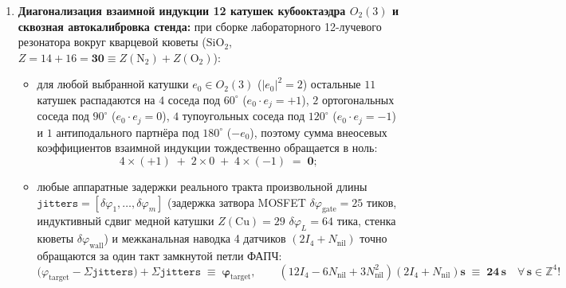 \begin{enumerate}[label=\textbf{\arabic*.},leftmargin=*]
\begin{itemize}[noitemsep]
  \item \emph{Слой~4 (Базовый переход IBC-$\mathrm{Si}$ с тыльными контактами):} принимает триплетную пару при шаге переноса $\Delta\varphi_{\mathrm{seam}} = 21 < 41$ по первому закону Ньютона в зазоре зацепления с \textbf{нулевым рождением тепловых фононов ($\hat{n}_E(21) = 0$)}!
  \end{itemize}
\item \textbf{Диагонализация взаимной индукции 12 катушек кубооктаэдра $O_2(3)$ и сквозная автокалибровка стенда:}
  при сборке лабораторного 12-лучевого резонатора вокруг кварцевой кюветы ($\mathrm{SiO_2}$, $Z = 14 + 16 = \mathbf{30} \equiv Z(\mathrm{N_2}) + Z(\mathrm{O_2})$):
  \begin{itemize}[noitemsep]
  \item для любой выбранной катушки $e_0\in O_2(3)$ ($|e_0|^2 = 2$) остальные $11$ катушек распадаются на $4$ соседа под $60^\circ$ ($e_0\cdot e_j = +1$), $2$ ортогональных соседа под $90^\circ$ ($e_0\cdot e_j = 0$), $4$ тупоугольных соседа под $120^\circ$ ($e_0\cdot e_j = -1$) и $1$ антиподального партнёра под $180^\circ$ ($-e_0$), поэтому сумма внеосевых коэффициентов взаимной индукции тождественно обращается в ноль:
    \[
      4\times(+1) \;+\; 2\times 0 \;+\; 4\times(-1) \;=\; \mathbf{0};
    \]
  \item любые аппаратные задержки реального тракта произвольной длины $\texttt{jitters} = [\delta\varphi_1,\dots,\delta\varphi_m]$ (задержка затвора MOSFET $\delta\varphi_{\mathrm{gate}} = 25$ тиков, индуктивный сдвиг медной катушки $Z(\mathrm{Cu})=29$ $\delta\varphi_L = 64$ тика, стенка кюветы $\delta\varphi_{\mathrm{wall}}$) и межканальная наводка 4 датчиков $(2I_4 + N_{\mathrm{nil}})$ точно обращаются за один такт замкнутой петли ФАПЧ:
    \[
      \bigl(\varphi_{\mathrm{target}} - \Sigma\texttt{jitters}\bigr) + \Sigma\texttt{jitters} \;\equiv\; \mathbf{\varphi_{\mathrm{target}}},
      \qquad
      (12 I_4 - 6 N_{\mathrm{nil}} + 3 N_{\mathrm{nil}}^2)(2 I_4 + N_{\mathrm{nil}})\mathbf{s} \;\equiv\; \mathbf{24\,\mathbf{s}}\quad\forall\,\mathbf{s}\in\mathbb{Z}^4!
    \]
  \end{itemize}
\end{enumerate}

